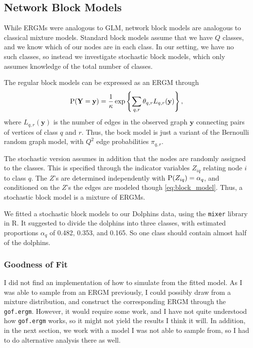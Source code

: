 \documentclass[11pt,a4paper]{article}
\begin{document}
\subsection{Network Block Models}
While ERGMs were analogous to GLM, network block models are analogous to classical mixture models. Standard block models assume that we have $Q$ classes, and we know which of our nodes are in each class. In our setting, we have no such classes, so instead we investigate stochastic block models, which only assumes knowledge of the total number of classes.

The regular block models can be expressed as an ERGM through
\begin{align}
    \label{eq:block_model}
    \text P(\mathbf{Y} = \mathbf{y}) = \frac{1}{\kappa} \exp \left\{\sum_{q, r} \theta_{q, r} L_{q, r}(\mathbf{y})\right\},
\end{align}
where $L_{q, r}(\mathbf{y})$ is the number of edges in the observed graph $\mathbf y$ connecting pairs of vertices of class $q$ and $r$. 
Thus, the bock model is just a variant of the Bernoulli random graph model, with $Q^2$ edge probabilities $\pi_{q, r}$.

The stochastic version assumes in addition that the nodes are randomly assigned to the classes. This is specified through the indicator variables $Z_{iq}$ relating node $i$ to class $q$. The $Z$'s are determined independently with $\text P(Z_{iq}) = \alpha_q$, and conditioned on the $Z$'s the edges are modeled though \eqref{eq:block_model}.
Thus, a stochastic block model is a mixture of ERGMs.

We fitted a stochastic block models to our Dolphins data, using the \verb+mixer+ library in R. It suggested to divide the dolphins into three classes, with estimated proportions $\alpha_q$ of 0.482, 0.353, and  0.165. So one class should contain almost half of the dolphins.

\subsubsection{Goodness of Fit}
I did not find an implementation of how to simulate from the fitted model. 
As I was able to sample from an ERGM previously, I could possibly draw from a mixture distribution, and construct the corresponding ERGM through the \verb+gof.ergm+. However, it would require some work, and I have not quite understood how \verb+gof.ergm+ works, so it might not yield the results I think it will.
In addition, in the next section, we work with a model I was not able to sample from, so I had to do alternative analysis there as well.
\end{document}
